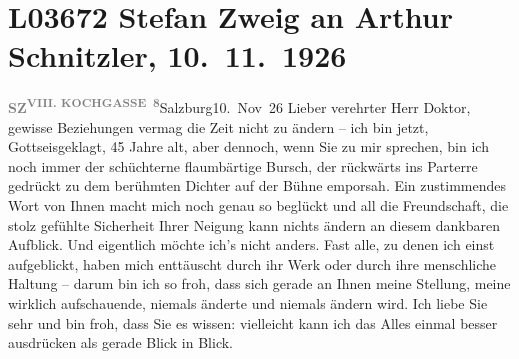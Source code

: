 

\section[Stefan Zweig an Arthur Schnitzler, 10. 11. 1926]{L03672 Stefan Zweig an Arthur Schnitzler, 10. 11. 1926}
\nopagebreak{}
\rehead{ }\normalsize\beginnumbering{}
\toendnotes[C]{\smallbreak\pagebreak[2]}
\toendnotes[C]{\smallbreak}
\pstart
           {\pb}\textcolor{gray}{\textbf{SZ}}\hfill \substVorne{}\textsuperscript{\textcolor{gray}{\textbf{VIII.
                              KOCHGASSE 8}}}\substDazwischen{}Salzburg10. Nov 26\substHinten{}\pend
           \vspace{0.5em}
\pstart
           Lieber verehrter Herr Doktor, gewisse Beziehungen vermag die Zeit
               nicht zu ändern – ich bin jetzt, Gottseisgeklagt, 45 Jahre alt, aber dennoch, wenn
               Sie zu mir sprechen, bin ich noch immer der schüchterne flaumbärtige Bursch, der
               rückwärts ins Parterre gedrückt  zu dem berühmten
               Dichter auf der Bühne \introOben{}empor\introOben{}sah. Ein zustimmendes Wort von
               Ihnen macht mich noch genau so beglückt und all die Freundschaft, die stolz gefühlte
                  {\pb}Sicherheit Ihrer Neigung kann nichts
               ändern an diesem dankbaren Aufblick. Und eigentlich möchte ich’s nicht anders. Fast
               alle, zu denen ich einst aufgeblickt, haben mich enttäuscht durch ihr Werk oder durch
               ihre menschliche Haltung – darum bin ich so froh, dass sich gerade an Ihnen meine
               Stellung, meine wirklich aufschauende, niemals änderte und niemals ändern wird. Ich
               liebe Sie sehr und bin froh, dass Sie es wissen: vielleicht kann ich das Alles einmal
               besser ausdrücken als gerade Blick in Blick.\pend
           
